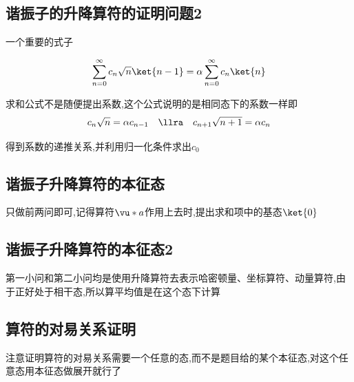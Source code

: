         \subsection{谐振子的升降算符的证明问题2}
            一个重要的式子

            $$ \sum_{n=0}^{\infty} c_{n} \sqrt{n} \ket{n-1} = \alpha \sum_{n=0}^{\infty} c_{n} \ket{n} $$

            求和公式不是随便提出系数,这个公式说明的是相同态下的系数一样即
            $$ c_{n} \sqrt{n}  = \alpha c_{n-1} \quad  \llra \quad c_{n+1} \sqrt{n+1} = \alpha c_{n} $$

            得到系数的递推关系,并利用归一化条件求出$c_{0}$

        \subsection{谐振子升降算符的本征态}
            只做前两问即可,记得算符$\vu*{a}$作用上去时,提出求和项中的基态$\ket{0}$
        
        \subsection{谐振子升降算符的本征态2}
            第一小问和第二小问均是使用升降算符去表示哈密顿量、坐标算符、动量算符,由于正好处于相干态,所以算平均值是在这个态下计算
        
        \subsection{算符的对易关系证明}
            注意证明算符的对易关系需要一个任意的态,而不是题目给的某个本征态,对这个任意态用本征态做展开就行了
        

        

